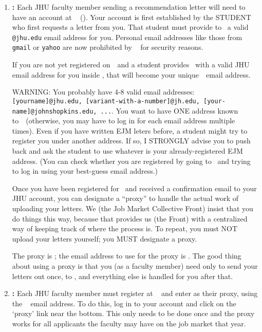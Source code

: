 \documentclass{\econtex}
\begin{document}
\begin{enumerate}
\item \textbf{\EJM:} Each JHU faculty member sending a recommendation letter will need to have an account at \EJM ~ (\EJMLink). Your account is first established by the STUDENT who first requests a letter from you. That student must provide to \EJM~a valid \texttt{@jhu.edu} email address for you.  Personal email addresses like those from \texttt{gmail} or \texttt{yahoo} are now prohibited by \EJM~ for security reasons. 

  \medskip
  If you are not yet registered on~\EJM~and a student provides \EJM~with a valid JHU email address for you inside \EJM, that will become your unique~\EJM~email address.

  WARNING: You probably have 4-8 valid email addresses: \texttt{[yourname]@jhu.edu, [variant-with-a-number]@jh.edu, [your-name]@johnshopkins.edu, ...}.  You want to have ONE address known to~{\EJM}~(otherwise, you may have to log in for each email address multiple times).  Even if you have written EJM leters before, a student might try to register you under another address.  If so, I STRONGLY advise you to push back and ask the student to use whatever is your already-registered EJM address.  (You can check whether you are registered by going to {\EJM}~and trying to log in using your best-guess email address.)

  Once you have been registered for \EJM~and received a confirmation email to your JHU account, you can designate a ``proxy'' to handle the actual work of uploading your letters.  We (the Job Market Collective Front) insist that you do things this way, because that provides us (the Front) with a centralized way of keeping track of where the process is.  To repeat, you must NOT upload your letters yourself; you MUST designate a proxy.

  The proxy is {\JMStaffName} \JMStaffNameLast; the email address to use for the proxy is
  \jmstaffemail.  The good thing about using a proxy is that you (as a faculty member)
  need only to send your letters out once, to \jmstaffemail, and everything 
  else is handled for you after that. %

  \item \textbf{\AJO:}
    Each JHU faculty member must register at \AJOLink~ and enter {\JMStaffName} \JMStaffNameLast as their proxy, using the
    \jmstaffemail~ email address. To do this, log in to your account and click on the `proxy' link near the bottom. This only needs to be done once and the proxy works for all applicants the faculty may have on the job market that year.


\end{enumerate}
\end{document}
